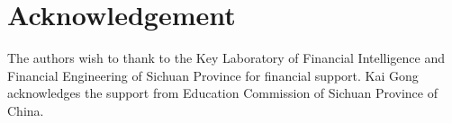 \section{Acknowledgement}
The authors wish to thank to the Key Laboratory of Financial Intelligence and Financial Engineering of Sichuan Province for financial support. 
Kai Gong acknowledges the support from Education Commission of Sichuan Province of China.